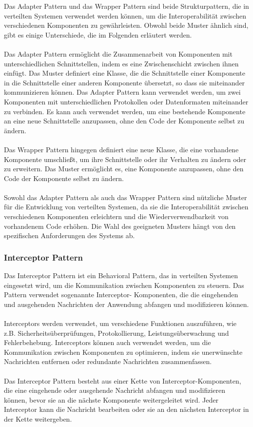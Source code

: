 \documentclass[../vs-script-first-v01.tex]{subfiles}
\begin{document}
Das Adapter Pattern und das Wrapper Pattern sind beide Strukturpattern, die in verteilten Systemen verwendet werden können, um die Interoperabilität zwischen verschiedenen Komponenten zu gewährleisten. Obwohl beide Muster ähnlich sind, gibt es einige Unterschiede, die im Folgenden erläutert werden.
\\\\
Das Adapter Pattern ermöglicht die Zusammenarbeit von Komponenten mit unterschiedlichen Schnittstellen, indem es eine Zwischenschicht zwischen ihnen einfügt. Das Muster definiert eine Klasse, die die Schnittstelle einer Komponente in die Schnittstelle einer anderen Komponente übersetzt, so dass sie miteinander kommunizieren können. Das Adapter Pattern kann verwendet werden, um zwei Komponenten mit unterschiedlichen Protokollen oder Datenformaten miteinander zu verbinden. Es kann auch verwendet werden, um eine bestehende Komponente an eine neue Schnittstelle anzupassen, ohne den Code der Komponente selbst zu ändern.
\\\\
Das Wrapper Pattern hingegen definiert eine neue Klasse, die eine vorhandene Komponente umschließt, um ihre Schnittstelle oder ihr Verhalten zu ändern oder zu erweitern. Das Muster ermöglicht es, eine Komponente anzupassen, ohne den Code der Komponente selbst zu ändern. 
\\\\
Sowohl das Adapter Pattern als auch das Wrapper Pattern sind nützliche Muster für die Entwicklung von verteilten Systemen, da sie die Interoperabilität zwischen verschiedenen Komponenten erleichtern und die Wiederverwendbarkeit von vorhandenem Code erhöhen. Die Wahl des geeigneten Musters hängt von den spezifischen Anforderungen des Systems ab.


\subsubsection{Interceptor Pattern}
Das Interceptor Pattern ist ein Behavioral Pattern, das in verteilten Systemen eingesetzt wird, um die Kommunikation zwischen Komponenten zu steuern. Das Pattern verwendet sogenannte Interceptor- Komponenten, die die eingehenden und ausgehenden Nachrichten der Anwendung abfangen und modifizieren können.
\\\\
Interceptors werden verwendet, um verschiedene Funktionen auszuführen, wie z.B. Sicherheitsüberprüfungen, Protokollierung, Leistungsüberwachung und Fehlerbehebung. Interceptors können auch verwendet werden, um die Kommunikation zwischen Komponenten zu optimieren, indem sie unerwünschte Nachrichten entfernen oder redundante Nachrichten zusammenfassen.
\\\\
Das Interceptor Pattern besteht aus einer Kette von Interceptor-Komponenten, die eine eingehende oder ausgehende Nachricht abfangen und modifizieren können, bevor sie an die nächste Komponente weitergeleitet wird. Jeder Interceptor kann die Nachricht bearbeiten oder sie an den nächsten Interceptor in der Kette weitergeben.
\end{document}
